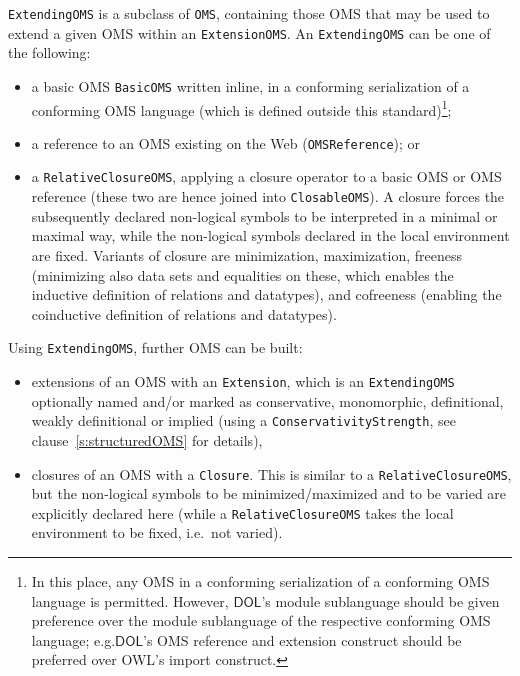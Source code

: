 \documentclass[10pt,fleqn,final]{scrreprt}
\makeatletter
\newcommand*{\eg}{e.g.\@\xspace}
\newcommand*{\syntax}[1]{\texttt{#1}}
\newcommand*{\DOL}{\ensuremath{\mathsf{DOL}}\xspace}
\newenvironment{definitions}[0]{\medskip }{}
\makeatother
\begin{document}
\begin{definitions}
\begin{center}
\end{center}

\newpage

\voffset -1cm

\syntax{ExtendingOMS} is a subclass of \syntax{OMS}, containing
those OMS that may be used to extend a given OMS within an \syntax{ExtensionOMS}.
An \syntax{ExtendingOMS} can be one of the following:
\begin{itemize}
\item a basic OMS \syntax{BasicOMS} written inline, in a conforming serialization of a conforming OMS 
language (which is defined outside this standard)\footnote{In this place, any OMS in a conforming serialization of a conforming OMS language is permitted.  
However, \DOL's module sublanguage should be given preference over the module sublanguage of 
the respective conforming OMS language; \eg \DOL's OMS reference and extension construct should be preferred over OWL's import construct.};
\item a reference to an OMS existing on the Web (\syntax{OMSReference}); or
\item a \syntax{RelativeClosureOMS}, applying a closure operator to a
  basic OMS or OMS reference (these two are hence joined into
  \syntax{ClosableOMS}). A closure forces the subsequently declared
  non-logical symbols to be interpreted in a minimal  or
  maximal way, while the non-logical symbols declared  in
  the local environment are fixed. Variants of closure are
  minimization, maximization, freeness (minimizing also data
  sets and equalities on these,  which enables the inductive
  definition of relations and datatypes), and cofreeness (enabling the
  coinductive definition of relations and datatypes).
\end{itemize}
Using \syntax{ExtendingOMS}, further OMS can be built:
\begin{itemize}
\item extensions of an OMS with an \syntax{Extension}, which is an \syntax{ExtendingOMS} optionally named and/or marked as conservative, monomorphic, definitional, weakly definitional or implied (using a \syntax{ConservativityStrength}, see clause~\ref{s:structuredOMS} for details),
\item  closures of an OMS with a \syntax{Closure}.  This is
  similar to a \syntax{RelativeClosureOMS}, but the non-logical
  symbols to be  minimized/maximized and to be varied are
  explicitly declared here (while a \syntax{RelativeClosureOMS} takes
  the local environment to be fixed, i.e.\ not varied).

\end{itemize}
\end{definitions}
\end{document}
